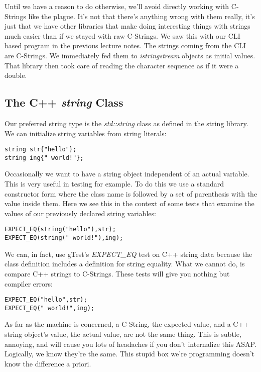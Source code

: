 \documentclass[]{tufte-handout}
\begin{document}
Until we have a reason to do otherwise, we'll avoid directly working with C-Strings like the plague. It's not that there's anything wrong with them really, it's just that we have other libraries that make doing interesting things with strings much easier than if we stayed with raw C-Strings. We saw this with our CLI based program in the previous lecture notes. The strings coming from the CLI are C-Strings. We immediately fed them to \textit{istringstream} objects as initial values. That library then took care of reading the character sequence as if it were a double. 

\subsection{The C++ \textit{string} Class}

Our preferred string type is the \textit{std::string} class as defined in the string library.  We can initialize string variables from string literals:
\begin{verbatim}
string str{"hello"};
string ing{" world!"};
\end{verbatim}
Occasionally we want to have a string object independent of an actual variable. This is very useful in testing for example. To do this we use a standard constructor form where the class name is followed by a set of parenthesis with the value inside them.  Here we see this in the context of some tests that examine the values of our previously declared string variables:
\begin{verbatim}
EXPECT_EQ(string("hello"),str);
EXPECT_EQ(string(" world!"),ing);
\end{verbatim}

We can, in fact, use gTest's \textit{EXPECT\_EQ} test on C++ string data because the class definition includes a definition for string equality. What we cannot do, is compare C++ strings to C-Strings. These tests will give you nothing but compiler errors:
\begin{verbatim}
EXPECT_EQ("hello",str);
EXPECT_EQ(" world!",ing);
\end{verbatim}
As far as the machine is concerned, a C-String, the expected value, and a C++ string object's value, the actual value, are not the same thing. This is subtle, annoying, and will cause you lots of headaches if you don't internalize this ASAP. Logically, we know they're the same. This stupid box we're programming doesn't know the difference a priori.
\end{document}
